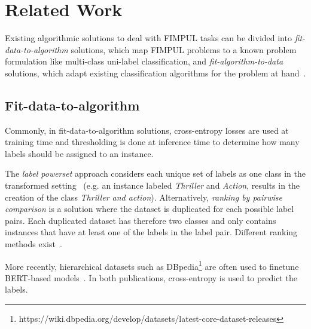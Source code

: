 
\section{Related Work}
\label{sec:org2aceb9f}

Existing algorithmic solutions to deal with FIMPUL tasks can be divided into
\emph{fit-data-to-algorithm} solutions, which map FIMPUL problems to a known
problem formulation like multi-class uni-label classification, and
\emph{fit-algorithm-to-data} solutions, which adapt existing classification
algorithms for the problem at hand~\citep{multilabelMethods}.

\subsection{Fit-data-to-algorithm}
Commonly, in fit-data-to-algorithm solutions, cross-entropy losses are used at
training time and thresholding is done at inference time to determine how many
labels should be assigned to an instance.

The \textit{label powerset} approach considers each unique set of labels as
one class in the transformed setting~\cite{multilabelComparison} (e.g. an
instance labeled \textit{Thriller} and \textit{Action}, results in the
creation of the class \textit{Thriller and action}). Alternatively,
\textit{ranking by pairwise comparison} is a solution where the dataset is
duplicated for each possible label pairs. Each duplicated dataset has
therefore two classes and only contains instances that have at least one of
the labels in the label pair. Different ranking methods
exist~\cite{pairwiseBinary, pairwiseNet}.

More recently, hierarchical datasets such as
DBpedia\footnote{https://wiki.dbpedia.org/develop/datasets/latest-core-dataset-releases}
are often used to finetune BERT-based models~\cite{XLNet, bigBird}. In both
publications, cross-entropy is used to predict the labels.

